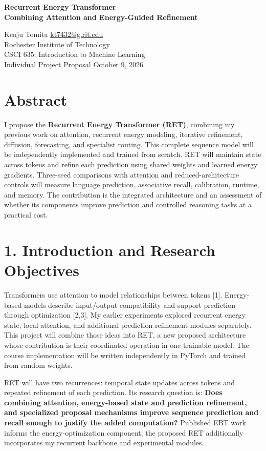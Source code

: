 \documentclass[11pt,letterpaper]{article}
\begin{document}
\begin{center}
{\Large\bfseries Recurrent Energy Transformer\\Combining Attention and Energy-Guided Refinement}\par
\vspace{3pt}
Kenju Tomita \quad \href{mailto:kt7432@g.rit.edu}{kt7432@g.rit.edu}\\
Rochester Institute of Technology\\
CSCI 635: Introduction to Machine Learning\\
Individual Project Proposal \quad October 9, 2026
\end{center}

\section*{Abstract}

I propose the \textbf{Recurrent Energy Transformer (RET)}, combining my previous work on attention, recurrent energy modeling, iterative refinement, diffusion, forecasting, and specialist routing. This complete sequence model will be independently implemented and trained from scratch. RET will maintain state across tokens and refine each prediction using shared weights and learned energy gradients. Three-seed comparisons with attention and reduced-architecture controls will measure language prediction, associative recall, calibration, runtime, and memory. The contribution is the integrated architecture and an assessment of whether its components improve prediction and controlled reasoning tasks at a practical cost.

\section*{1. Introduction and Research Objectives}

Transformers use attention to model relationships between tokens [1]. Energy-based models describe input/output compatibility and support prediction through optimization [2,3]. My earlier experiments explored recurrent energy state, local attention, and additional prediction-refinement modules separately. This project will combine those ideas into RET, a new proposed architecture whose contribution is their coordinated operation in one trainable model. The course implementation will be written independently in PyTorch and trained from random weights.

RET will have two recurrences: temporal state updates across tokens and repeated refinement of each prediction. Its research question is: \textbf{Does combining attention, energy-based state and prediction refinement, and specialized proposal mechanisms improve sequence prediction and recall enough to justify the added computation?} Published EBT work informs the energy-optimization component; the proposed RET additionally incorporates my recurrent backbone and experimental modules.
\end{document}
